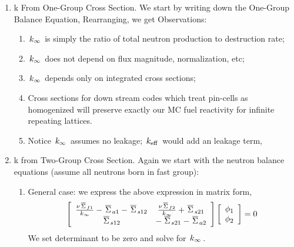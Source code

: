 \documentclass{school-22.211-notes}
\begin{document}
\begin{enumerate}
\item k From One-Group Cross Section. We start by writing down the One-Group Balance Equation, 
Rearranging, we get 
Observations:
\begin{enumerate}
\item $\left. k_{\infty} \right.$ is simply the ratio of total neutron production to destruction rate;
\item $\left. k_{\infty} \right.$ does not depend on flux magnitude, normalization, etc;
\item $\left. k_{\infty} \right.$ depends only on integrated cross sections;
\item Cross sections for down stream codes which treat pin-cells as homogenized will preserve exactly our MC fuel reactivity for infinite repeating lattices. 
\item Notice $\left. k_{\infty} \right.$ assumes no leakage; $\left. k_{\mathrm{eff}} \right.$ would add an leakage term,
\end{enumerate}


\item k from Two-Group Cross Section. Again we start with the neutron balance equations (assume all neutrons born in fast group):
 

\begin{enumerate}
\item General case: we express the above expression in matrix form, 
  \begin{align}
    \left[ \begin{array}{cc} 
        \frac{\nu \left.\overline{\Sigma} \right._{f1}}{\left. k_{\infty} \right.} -  \left.\overline{\Sigma} \right._{a1}  - \left.\overline{\Sigma} \right._{s12} & \frac{\nu \left.\overline{\Sigma} \right._{f2}}{\left. k_{\infty} \right.}  + \left.\overline{\Sigma} \right._{s21}  \\
        \left.\overline{\Sigma} \right._{s12} & - \left.\overline{\Sigma} \right._{s21} - \left.\overline{\Sigma} \right._{a2}  
      \end{array} \right] 
    \left[ \begin{array}{c} \phi_1 \\ \phi_2 \end{array} \right] = 0
  \end{align}
  We set determinant to be zero and solve for $\left. k_{\infty} \right.$. 


\end{enumerate}
\end{enumerate}
\end{document}
